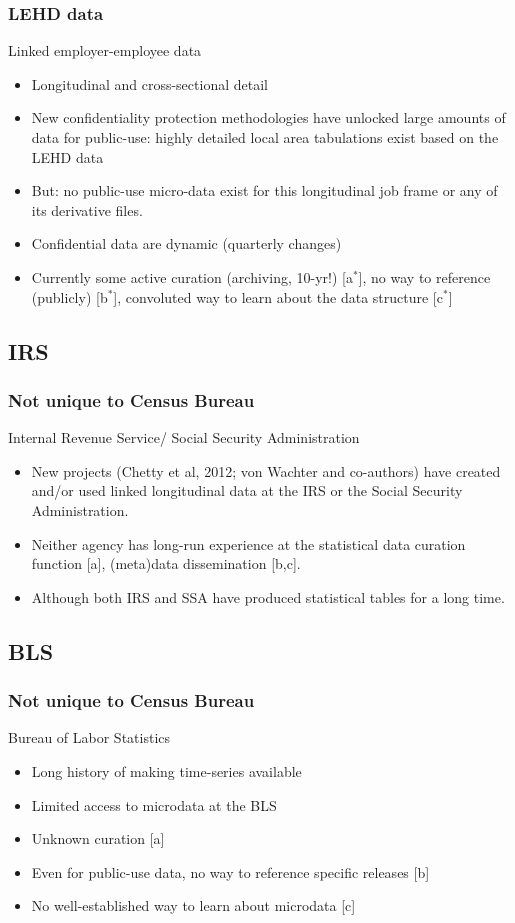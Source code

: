 \begin{frame}
\frametitle{LEHD data}
\begin{block}{Linked employer-employee data}
\begin{itemize}
\item Longitudinal and cross-sectional detail
\item New confidentiality protection methodologies \cite{AbowdEtAl2012,Ashwin2008}
have unlocked large amounts of data for public-use: highly detailed local area tabulations
exist based on the {LEHD} data
\item But: no public-use micro-data exist for this
longitudinal job frame or any of its derivative files.
\item Confidential data are dynamic (quarterly changes)
\item Currently some active curation (archiving, 10-yr!) [a$^*$], no way to reference (publicly) [b$^*$], convoluted way to learn about the data structure [c$^*$]
\end{itemize}
\end{block}
\end{frame}
\subsection{IRS}
\begin{frame}[label=IRS]
\frametitle{Not unique to Census Bureau}
\begin{block}{Internal Revenue Service/ Social Security Administration}
\begin{itemize}
\item
New projects (Chetty et al, 2012; von Wachter and co-authors) have created and/or used linked longitudinal data at the IRS or the Social Security Administration.
\item Neither agency has long-run experience at the statistical data curation function [a], (meta)data dissemination [b,c].
\item Although both IRS and SSA have produced statistical tables for a long time.
\end{itemize}
\end{block}
\end{frame}
\subsection{BLS}
\begin{frame}[label=BLS]
\frametitle{Not unique to Census Bureau}
\begin{block}{Bureau of Labor Statistics}
\begin{itemize}
\item Long history of making time-series available
\item Limited access to microdata at the BLS 
\item Unknown curation [a]
\item Even for public-use data, no way to reference specific releases [b]
\item No well-established way to learn about microdata [c]
\end{itemize}
\end{block}
\end{frame}


